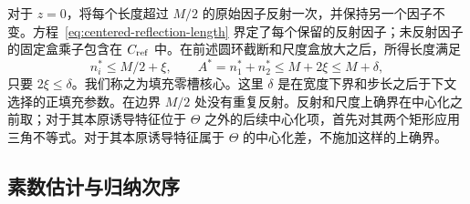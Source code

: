 \documentclass[11pt,a4paper]{article}
\numberwithin{equation}{section}
\numberwithin{figure}{section}
\theoremstyle{definition}
\theoremstyle{remark}
\begin{document}
对于 \(z=0\)，将每个长度超过 \(M/2\) 的原始因子反射一次，并保持另一个因子不变。方程~\eqref{eq:centered-reflection-length} 界定了每个保留的反射因子；未反射因子的固定盒乘子包含在 \(C_{\rm ref}\) 中。在前述圆环截断和尺度盒放大之后，所得长度满足
\begin{equation}
 n_i^*\le M/2+\xi,\qquad
 A^*=n_1^*+n_2^*\le M+2\xi\le M+\delta,
 \label{old-eq:2.1h}
\end{equation}
只要 \(2\xi\le\delta\)。我们称之为填充零槽核心。这里 \(\delta\) 是在宽度下界和步长之后于下文选择的正填充参数。在边界 \(M/2\) 处没有重复反射。反射和尺度上确界在中心化之前取；对于其本原诱导特征位于 \(\Theta\) 之外的后续中心化项，首先对其两个矩形应用三角不等式。对于其本原诱导特征属于 \(\Theta\) 的中心化差，不施加这样的上确界。\subsection{素数估计与归纳次序}\label{sec:weighted}
\end{document}
